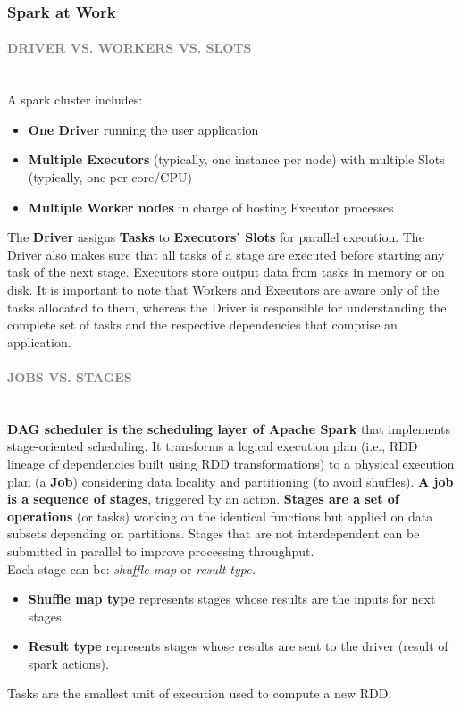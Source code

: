 \documentclass[10pt,a4paper]{article}
\newcommand{\myparagraph}[1]{\paragraph{\normalsize{\textcolor{gray}{\uppercase{\textbf{#1}}}} }\mbox{} \vspace{0.5em}\\}
\begin{document}
\subsubsection{Spark at Work}
\myparagraph{Driver vs. Workers vs. Slots}
A spark cluster includes:
\begin{itemize}
	\item \textbf{One Driver} running the user application
	\item \textbf{Multiple Executors} (typically, one instance per node) with multiple Slots (typically, one per core/CPU)
	\item \textbf{Multiple Worker nodes} in charge of hosting Executor processes
\end{itemize}
The \textbf{Driver} assigns \textbf{Tasks} to \textbf{Executors’ Slots} for parallel execution. The Driver also makes sure that all tasks of a stage are executed before starting any task of the next stage.
Executors store output data from tasks in memory or on disk. It is important to note that Workers and Executors are aware only of the tasks allocated to them, whereas the Driver is responsible for understanding the complete set of tasks and the respective dependencies that comprise an application.
\myparagraph{Jobs vs. Stages}
\textbf{DAG scheduler is the scheduling layer of Apache Spark} that implements stage-oriented scheduling. It transforms a logical execution plan (i.e., RDD lineage of dependencies built using RDD transformations) to a physical execution plan (a \textbf{Job}) considering data locality and partitioning (to avoid shuffles). \textbf{A job is a sequence of stages}, triggered by an action. \textbf{Stages are a set of operations} (or tasks) working on the identical functions but applied on data subsets depending on partitions. Stages that are not interdependent can be submitted in parallel to improve processing throughput.  \\
Each stage can be: \textit{shuffle map} or \textit{result type.}
\begin{itemize}
	\item \textbf{Shuffle map type} represents stages whose results are the inputs for next stages.
	\item \textbf{Result type} represents stages whose results are sent to the driver (result of spark actions).
\end{itemize}
Tasks are the smallest unit of execution used to compute a new RDD.
\end{document}
